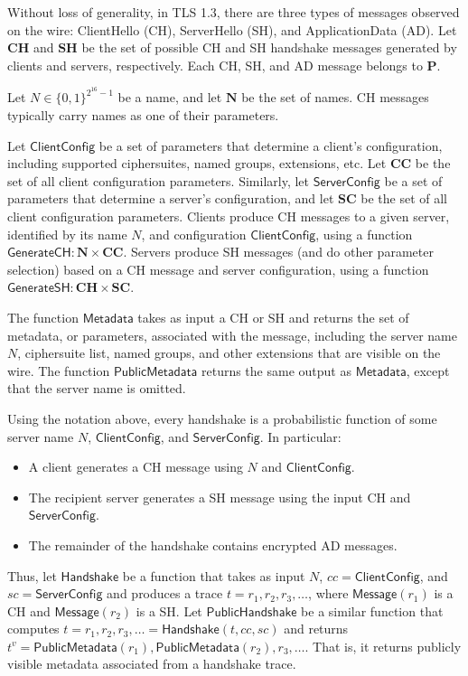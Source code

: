 \documentclass{article}
\theoremstyle{definition}
\begin{document}
Without loss of generality, in TLS 1.3, there are three types of messages observed
on the wire: ClientHello (CH), ServerHello (SH), and ApplicationData (AD). Let $\mathbf{CH}$ 
and $\mathbf{SH}$ be the set of possible CH and SH handshake messages generated by 
clients and servers, respectively. Each CH, SH, and AD message belongs to $\mathbf{P}$.

Let $N \in \{0,1\}^{2^{16} - 1}$ be a name, and let $\mathbf{N}$ be the set of names. 
CH messages typically carry names as one of their parameters.

Let $\mathsf{ClientConfig}$ be a set of parameters that determine a client's configuration,
including supported ciphersuites, named groups, extensions, etc. 
Let $\mathbf{CC}$ be the set of all client configuration parameters.
Similarly, let $\mathsf{ServerConfig}$ be a set of parameters that determine a server's configuration,
and let $\mathbf{SC}$ be the set of all client configuration parameters.
Clients produce CH messages to a given server, identified by its name $N$, and configuration
$\mathsf{ClientConfig}$, using a function $\mathsf{GenerateCH}: \mathbf{N} \times \mathbf{CC}$.
Servers produce SH messages (and do other parameter selection) based on a CH message and 
server configuration, using a function $\mathsf{GenerateSH}: \mathbf{CH} \times \mathbf{SC}$.

The function $\mathsf{Metadata}$ takes as input a CH or SH and returns the set of metadata,
or parameters, associated with the message, including the server name $N$, ciphersuite list,
named groups, and other extensions that are visible on the wire. The function
$\mathsf{PublicMetadata}$ returns the same output as $\mathsf{Metadata}$, except that
the server name is omitted. 

Using the notation above, every handshake is a probabilistic function of some server name $N$,
$\mathsf{ClientConfig}$, and $\mathsf{ServerConfig}$. In particular:
%
\begin{itemize}
    \item A client generates a CH message using $N$ and $\mathsf{ClientConfig}$.
    \item The recipient server generates a SH message using the input CH and $\mathsf{ServerConfig}$.
    \item The remainder of the handshake contains encrypted AD messages.
\end{itemize}
%
Thus, let $\mathsf{Handshake}$ be a function that takes as input $N$,
$cc = \mathsf{ClientConfig}$, and $sc = \mathsf{ServerConfig}$ and produces a trace 
$t = r_1, r_2, r_3, \dots$, where $\mathsf{Message}(r_1)$ is a CH and 
$\mathsf{Message}(r_2)$ is a SH. Let $\mathsf{PublicHandshake}$ be a similar
function that computes $t = r_1, r_2, r_3, \dots = \mathsf{Handshake}(t, cc, sc)$ and returns 
$t^v = \mathsf{PublicMetadata}(r_1), \mathsf{PublicMetadata}(r_2), r_3, \dots$. That is,
it returns publicly visible metadata associated from a handshake trace. 
\end{document}
